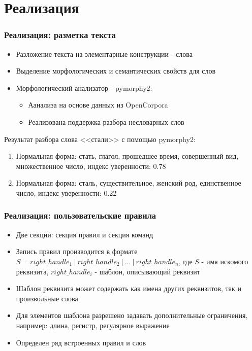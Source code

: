 \documentclass{beamer}
\begin{document}
\section{Реализация}
\begin{frame}[fragile]
\frametitle{Реализация: разметка текста}
\begin{itemize}
	\item Разложение текста на элементарные конструкции - слова
	\item Выделение морфологических и семантических свойств для слов
	\item Морфологический анализатор - pymorphy2:
	\begin{itemize}
		\item Аанализа на основе данных из OpenCorpora
		\item Реализована поддержка разбора несловарных слов
	\end{itemize}
\end{itemize}
\begin{example}
Результат разбора слова <<стали>> с помощью pymorphy2:
\begin{enumerate}
	\item Нормальная форма: стать, глагол, прошедшее время, совершенный вид, множественное число, индекс уверенности: 0.78
	\item Нормальная форма: сталь, существительное, женский род, единственное число, индекс уверенности: 0.22
\end{enumerate}
\end{example}
\end{frame}

\begin{frame}
\frametitle{Реализация: пользовательские правила}
\begin{itemize}
	\item Две секции: секция правил и секция команд
	\item Запись правил производится в формате $S = right\_handle_1\ |\ right\_handle_2\ |\ ...\ |\ right\_handle_n$, где $S$ - имя искомого реквизита, $right\_handle_i$ - шаблон, описывающий реквизит
	\item Шаблон реквизита может содержать как имена других реквизитов, так и произвольные слова
	\item Для элементов шаблона разрешено задавать дополнительные ограничения, например: длина, регистр, регулярное выражение
	\item Определен ряд встроенных правил и слов
\end{itemize}
\end{frame}
\end{document}

